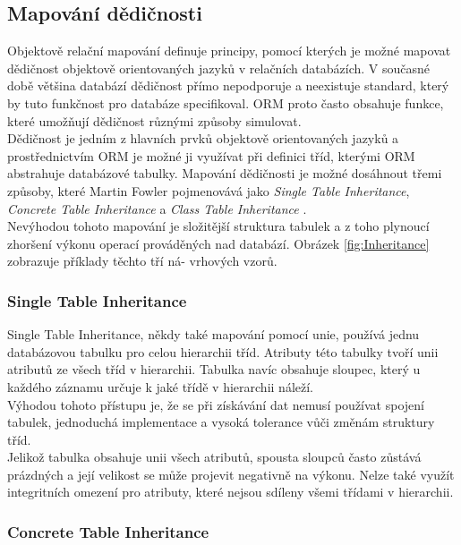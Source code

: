 \documentclass[ing,male,java,dept456]{diploma}						%
\begin{document}
\subsection{Mapování dědičnosti}
\label{subsec:Inhmapping}
Objektově relační mapování definuje principy, pomocí kterých je možné mapovat dědičnost objektově orientovaných jazyků v relačních databázích. V současné době většina databází dědičnost přímo nepodporuje a neexistuje standard, který by tuto funkčnost pro databáze specifikoval. ORM proto často obsahuje funkce, které umožňují dědičnost různými způsoby simulovat. \\
Dědičnost je jedním z hlavních prvků objektově orientovaných jazyků a prostřednictvím ORM je možné ji využívat při definici tříd, kterými ORM abstrahuje databázové tabulky. Mapování dědičnosti je možné dosáhnout třemi způsoby, které Martin Fowler pojmenovává jako \textit{Single Table Inheritance}, \textit{Concrete Table Inheritance} a \textit{Class Table Inheritance} \cite{fowler}. \\
Nevýhodou tohoto mapování je složitější struktura tabulek a z toho plynoucí zhoršení výkonu operací prováděných nad databází. Obrázek \ref{fig:Inheritance} zobrazuje příklady těchto tří ná- vrhových vzorů.


\subsubsection{Single Table Inheritance}

Single Table Inheritance, někdy také mapování pomocí unie, používá jednu databázovou tabulku pro celou hierarchii tříd. Atributy této tabulky tvoří unii atributů ze všech tříd v hierarchii. Tabulka navíc obsahuje sloupec, který u každého záznamu určuje k jaké třídě v hierarchii náleží. \\
Výhodou tohoto přístupu je, že se při získávání dat nemusí používat spojení tabulek, jednoduchá implementace a vysoká tolerance vůči změnám struktury tříd. \\
Jelikož tabulka obsahuje unii všech atributů, spousta sloupců často zůstává prázdných a její velikost se může projevit negativně na výkonu. Nelze také využít integritních omezení pro atributy, které nejsou sdíleny všemi třídami v hierarchii.

\subsubsection{Concrete Table Inheritance}
\end{document}
